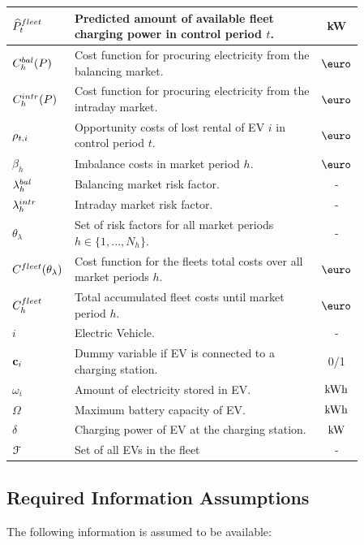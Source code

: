 \documentclass[a4paper, 12pt]{article}
\begin{document}
\begin{longtable}{p{0.11\linewidth}|p{0.75\linewidth}|c}
\(\widehat{P}^{fleet}_{t}\) & Predicted amount of available fleet charging power in control period \(t\). & kW\\
\hline
\(C^{bal}_{h}(P)\) & Cost function for procuring electricity from the balancing market. & \(\eur\)\\
\(C^{intr}_{h}(P)\) & Cost function for procuring electricity from the intraday market. & \(\eur\)\\
\(\rho_{t,i}\) & Opportunity costs of lost rental of EV \(i\) in control period \(t\). & \(\eur\)\\
\(\beta_h\) & Imbalance costs in market period \(h\). & \(\eur\)\\
\hline
\(\lambda^{bal}_{h}\) & Balancing market risk factor. & -\\
\(\lambda^{intr}_{h}\) & Intraday market risk factor. & -\\
\(\theta_{\lambda}\) & Set of risk factors for all market periods \(h\!\in\!\{1,...,N_h\}\). & -\\
\(C^{fleet}_{}(\theta_{\lambda})\) & Cost function for the fleets total costs over all market periods \(h\). & \(\eur\)\\
\(C^{fleet}_{h}\) & Total accumulated fleet costs until market period \(h\). & \(\eur\)\\
\hline
\(i\) & Electric Vehicle. & -\\
\({\bf{c}}_{i}\) & Dummy variable if EV is connected to a charging station. & 0/1\\
\(\omega_{i}\) & Amount of electricity stored in EV. & \(\text{kWh}\)\\
\(\Omega\) & Maximum battery capacity of EV. & \(\text{kWh}\)\\
\(\delta\) & Charging power of EV at the charging station. & \(\text{kW}\)\\
\({\cal{F}}\) & Set of all EVs in the fleet & -\\
\hline
\end{longtable}

\subsection{Required Information Assumptions \label{sec-model-assumptions}}
\label{sec:orgeece0fa}
The following information is assumed to be available:
\end{document}
